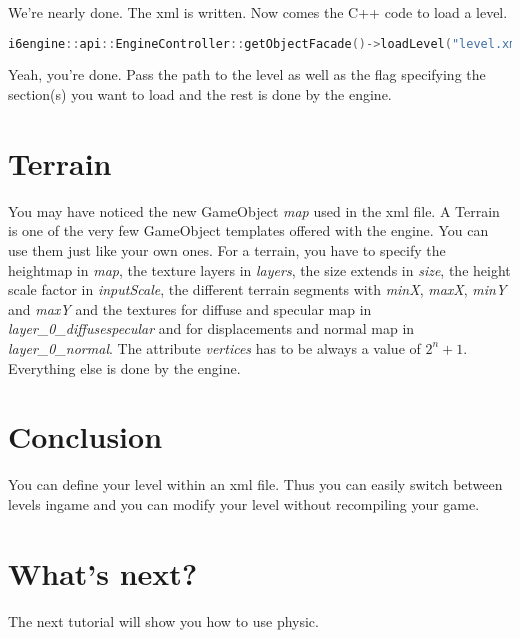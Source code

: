\documentclass{article}
\begin{document}
We're nearly done. The xml is written. Now comes the C++ code to load a level.

\begin{lstlisting}[language=C++, style=basic, caption={loading a level}, label=code:load]
i6engine::api::EngineController::getObjectFacade()->loadLevel("level.xml", "A");
\end{lstlisting}

Yeah, you're done. Pass the path to the level as well as the flag specifying the section(s) you want to load and the rest is done by the engine.

\section{Terrain}

You may have noticed the new GameObject \textit{map} used in the xml file. A Terrain is one of the very few GameObject templates offered with the engine. You can use them just like your own ones. For a terrain, you have to specify the heightmap in \textit{map}, the texture layers in \textit{layers}, the size extends in \textit{size}, the height scale factor in \textit{inputScale}, the different terrain segments with \textit{minX}, \textit{maxX}, \textit{minY} and \textit{maxY} and the textures for diffuse and specular map in \textit{layer\_{}0\_{}diffusespecular} and for displacements and normal map in \textit{layer\_{}0\_{}normal}. The attribute \textit{vertices} has to be always a value of $2^n + 1$. Everything else is done by the engine.

\section{Conclusion}

You can define your level within an xml file. Thus you can easily switch between levels ingame and you can modify your level without recompiling your game.

\section{What's next?}

The next tutorial will show you how to use physic.
\end{document}
